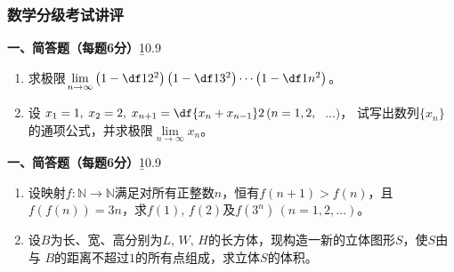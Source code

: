 \begin{frame}
	\frametitle{数学分级考试讲评}
	\linespread{1.2}
	\begin{center}
	\end{center}
\end{frame}

\begin{frame}
	\linespread{1.2}
	\begin{exampleblock}{{\bf 一、简答题（每题6分）}\hfill {\b 10.9}}\pause
		\begin{enumerate}
		  \item 求极限$\lim\limits_{n\to\infty}\left(1-\df 1{2^2}\right)\left(1-\df
		  1{3^2}\right)\cdots\left(1-\df 1{n^2}\right)$。\pause
		  \bigskip
		  \item 设$x_1=1,\;x_2=2,\;x_{n+1}=\df{x_n+x_{n-1}}2\,(n=1,2,$ $\ldots)$，
		  试写出数列$\{x_n\}$的通项公式，并求极限$\lim\limits_{n\to\infty}x_n$。
		\end{enumerate}
	\end{exampleblock}
\end{frame}

\begin{frame}
	\linespread{1.3}
	\begin{exampleblock}{{\bf 一、简答题（每题6分）}\hfill {\b 10.9}}
		\begin{enumerate}
		  \addtocounter{enumi}{2}
		  \item 设映射$f:\mathbb{N}\to\mathbb{N}$满足对所有正整数$n$，恒有$f(n+1)>f(n)$，且
		  $f(f(n))=3n$，求$f(1),\,f(2)$及$f(3^n)\,(n=1,2,\ldots)$。\pause
		  \bigskip
		  \item 设$B$为长、宽、高分别为$L,\,W,\,H$的长方体，现构造一新的立体图形$S$，使$S$由与
		  $B$的距离不超过$1$的所有点组成，求立体$S$的体积。
		\end{enumerate}
	\end{exampleblock}
\end{frame}

